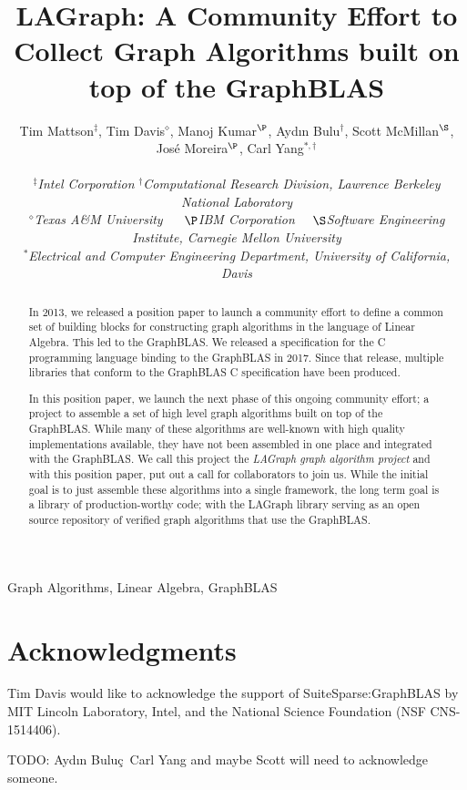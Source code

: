 \documentclass[10pt, conference, compsocconf,letter]{IEEEtran}
\title{LAGraph: A Community Effort to Collect Graph Algorithms built on top of the GraphBLAS}
\author{
Tim Mattson$^\ddag$, Tim Davis$^\diamond$, Manoj Kumar$^\P$, Ayd\i n Bulu\qc$^\dag$, Scott McMillan$^\S$, Jos\'e Moreira$^\P$, Carl Yang$^{*,\dag}$ \\
\\

 \normalsize
 {\em $^\ddag$Intel Corporation}  {\em $^\dag$Computational Research Division, Lawrence Berkeley National Laboratory} \\
{\em $^\diamond$Texas A\&M University} ~~ {\em $\P$IBM Corporation}~~ {\em $\S$Software Engineering Institute, Carnegie Mellon University}   \\
{\em $^*$Electrical and Computer Engineering Department, University of California, Davis}
 }
\newcommand{\qc}{\c{c}}
\begin{document}
\maketitle

\begin{abstract}

In 2013, we released a position paper to launch a community effort to define a 
common set of building blocks for constructing graph algorithms in the language of Linear Algebra.
This led to the GraphBLAS.   We released a specification for the C programming language binding to the
GraphBLAS in 2017.  Since that release, multiple libraries that conform to the 
GraphBLAS C specification have been produced.

In this position paper, we launch the next phase of this ongoing community effort; a project to
assemble a set of high level graph algorithms built on top of the GraphBLAS.  While many 
of these algorithms are well-known with high quality implementations available,
they have not been assembled in one place and integrated with the GraphBLAS.  We call 
this project the \emph{LAGraph graph algorithm project} and with this position paper, put out a 
call for collaborators to join us.  While the initial goal is to just assemble
these algorithms into a single framework, the long term goal is a library of production-worthy code;
with the LAGraph library serving as an open source repository of verified graph algorithms that use the
GraphBLAS. 

\end{abstract}

\begin{IEEEkeywords}
Graph Algorithms, Linear Algebra, GraphBLAS
\end{IEEEkeywords}











\section*{Acknowledgments}

Tim Davis would like to acknowledge the support of SuiteSparse:GraphBLAS by MIT
Lincoln Laboratory, Intel, and the National Science Foundation (NSF
CNS-1514406).

TODO: Ayd\i n Bulu\qc\, Carl Yang and maybe Scott will need to acknowledge someone.



\end{document}
